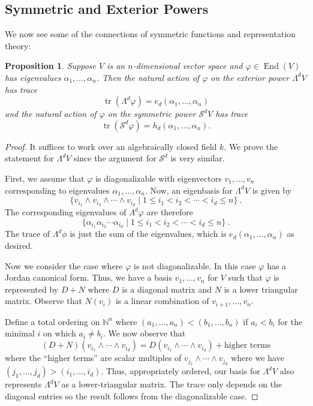 \documentclass[12pt]{article}
\theoremstyle{plain}
\newtheorem{proposition}[theorem]{Proposition}
\theoremstyle{definition}
\theoremstyle{remark}
\numberwithin{equation}{section}
\begin{document}
\subsection{Symmetric and Exterior Powers}

We now see some of the connections of symmetric functions and
representation theory:

\begin{proposition}
Suppose $V$ is an $n$-dimensional vector space and
$\varphi \in \operatorname{End}(V)$ has eigenvalues
$\alpha_1,\ldots,\alpha_n$.
Then the natural action of $\varphi$ on the exterior power $\Lambda^d V$
has trace
\[
\operatorname{tr}\left( \Lambda^d \varphi \right)
= e_d(\alpha_1,\ldots,\alpha_n)
\]
and the natural action of $\varphi$ on the symmetric power
$\mathcal{S}^d V$ has trace
\[
\operatorname{tr}\left( \mathcal{S}^d \varphi \right)
= h_d(\alpha_1,\ldots,\alpha_n).
\]
\end{proposition}

\begin{proof}
It suffices to work over an algebraically closed field $k$.
We prove the statement for $\Lambda^d V$ since the argument for
$\mathcal{S}^d$ is very similar. 

First, we assume that $\varphi$ is diagonalizable with eigenvectors
$v_1,\ldots, v_n$ corresponding to eigenvalues
$\alpha_1,\ldots,\alpha_n$.
Now, an eigenbasis for $\Lambda^d V$ is given by
\[
\{ v_{i_1}\wedge v_{i_2}\wedge \cdots \wedge v_{i_d} \mid
1 \le i_1 < i_2 < \cdots < i_d \le n \} \ .
\]
The corresponding eigenvalues of $\Lambda^d \varphi$ are therefore
\[
\{ \alpha_{i_1} \alpha_{i_2} \cdots \alpha_{i_d} \mid
1 \le i_1 < i_2 < \cdots < i_d \le n \} \ .
\]
The trace of $\Lambda^d \phi$ is just the sum of the eigenvalues, which
is $e_d(\alpha_1,\ldots,\alpha_n)$ as desired.

Now we consider the case where $\varphi$ is not diagonalizable.
In this case $\varphi$ has a Jordan canonical form.  Thus,
we have a basis $v_1,\ldots, v_n$ for $V$ such that $\varphi$ is
represented by $D+N$ where $D$ is a diagonal matrix and
$N$ is a lower triangular matrix.
Observe that $N(v_i)$ is a linear combination of $v_{i+1},\ldots, v_n$.

Define a total ordering on $\mathbb{N}^n$ where
$(a_1,\ldots,a_n) < (b_1,\ldots,b_n)$ if $a_i < b_i$ for the minimal $i$
on which $a_i \ne b_i$.
We now observe that
\[
(D+N)(v_{i_1}\wedge \cdots \wedge v_{i_d})
= D(v_{i_1}\wedge \cdots \wedge v_{i_d})
+ \textrm{higher terms} 
\]
where the ``higher terms'' are scalar multiples of
$v_{j_1}\wedge \cdots \wedge v_{j_d}$
where we have $(j_1,\ldots,j_d) > (i_1,\ldots,i_d)$.
Thus, appropriately ordered, our basis for $\Lambda^d V$
also represents $\Lambda^d V$ as a lower-triangular matrix.
The trace only depends on the diagonal entries so the result follows
from the diagonalizable case.
\end{proof}
\end{document}
